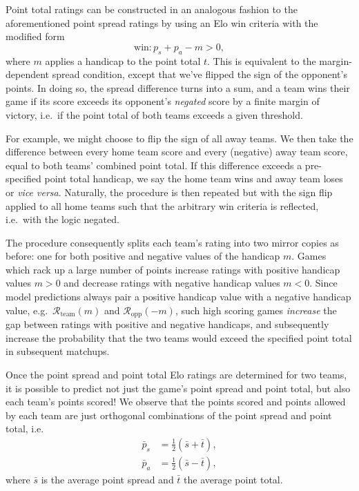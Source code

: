 \documentclass[aps,prc,reprint,amsmath,superscriptaddress]{revtex4-1}
\begin{document}
Point total ratings can be constructed in an analogous fashion to the aforementioned point spread ratings by using an Elo win criteria with the modified form
\begin{equation}
  \label{win_total}
  \text{win}: p_s + p_a - m > 0,
\end{equation}
where $m$ applies a handicap to the point total $t$.
This is equivalent to the margin-dependent spread condition, except that we've flipped the sign of the opponent's points.
In doing so, the spread difference turns into a sum, and a team wins their game if its score exceeds its opponent's \emph{negated} score by a finite margin of victory, i.e.\ if the point total of both teams exceeds a given threshold.

For example, we might choose to flip the sign of all away teams.
We then take the difference between every home team score and every (negative) away team score, equal to both teams' combined point total.
If this difference exceeds a pre-specified point total handicap, we say the home team wins and away team loses or \emph{vice versa}.
Naturally, the procedure is then repeated but with the sign flip applied to all home teams such that the arbitrary win criteria is reflected, i.e.\ with the logic negated.

The procedure consequently splits each team's rating into two mirror copies as before: one for both positive and negative values of the handicap $m$.
Games which rack up a large number of points increase ratings with positive handicap values $m > 0$ and decrease ratings with negative handicap values $m < 0$.
Since model predictions always pair a positive handicap value with a negative handicap value, e.g.\ $\mathcal{R}_\text{team}(m)$ and $\mathcal{R}_\text{opp}(-m)$, such high scoring games \emph{increase} the gap between ratings with positive and negative handicaps, and subsequently increase the probability that the two teams would exceed the specified point total in subsequent matchups.

Once the point spread and point total Elo ratings are determined for two teams, it is possible to predict not just the game's point spread and point total, but also each team's points scored!
We observe that the points scored and points allowed by each team are just orthogonal combinations of the point spread and point total, i.e.\
\begin{align}
  \bar{p}_s &= \tfrac{1}{2}(\bar{s} + \bar{t}),\nonumber \\
  \bar{p}_a &= \tfrac{1}{2}(\bar{s} - \bar{t}),
  \label{points}
\end{align}
where $\bar{s}$ is the average point spread and $\bar{t}$ the average point total.
\end{document}

